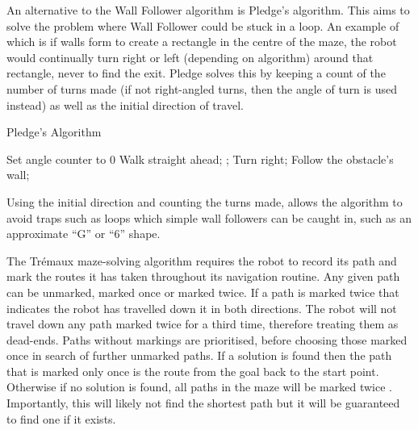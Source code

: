 An alternative to the Wall Follower algorithm is Pledge's algorithm. This
aims to solve the problem where Wall Follower could be stuck in a loop. An 
example of which is if walls form to create a rectangle in the centre of 
the maze, the robot would continually turn right or left (depending on
algorithm) around that rectangle, never to find the exit. Pledge solves this
by keeping a count of the number of turns made (if not right-angled turns,
then the angle of turn is used instead) as well as the initial direction of
travel. \cite{klein2011pledge}

\begin{algorithm}
\caption{Pledge's Algorithm}
\begin{algorithmic}
\STATE Set angle counter to 0
\REPEAT
\REPEAT
\STATE Walk straight ahead;
;
\STATE Turn right;
\REPEAT
\STATE Follow the obstacle's wall;
\end{algorithmic}
\end{algorithm}

Using the initial direction and counting the turns made, allows the 
algorithm to avoid traps such as loops which simple wall followers can be caught in, such as an approximate ``G'' or ``6'' shape.

The Trémaux maze-solving algorithm requires the robot to record its 
path and mark the routes it has taken throughout its navigation routine. Any 
given path  can be unmarked, marked once or marked twice. If a path is marked 
twice that indicates the robot has travelled down it in both directions. The 
robot will not travel down any path marked twice for a third time, therefore 
treating them as dead-ends. Paths without markings are prioritised, before 
choosing those marked once in search of further unmarked paths. If a 
solution is found then the path that is marked only once is the route 
from the goal back to the start point. Otherwise if no solution is found,
all paths in the maze will be marked twice \cite{even2011graph}.
Importantly, this will likely not find the shortest path but it will be 
guaranteed to find one if it exists.


